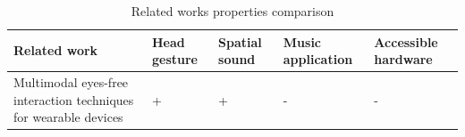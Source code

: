 \begin{table}[h] 
\caption{Related works properties comparison} %

\begin{tabular}{L{3cm}C{2cm}C{2cm}C{2cm}C{2cm}} \toprule
    Related work & Head gesture & Spatial sound & Music application & Accessible hardware \\ \midrule
    Multimodal eyes-free interaction techniques for wearable devices \cite{brewster_multimodaleyes-freeinteraction_2003}  & + & + & - & - \\ \bottomrule
\end{tabular}

 
 

\end{table}
